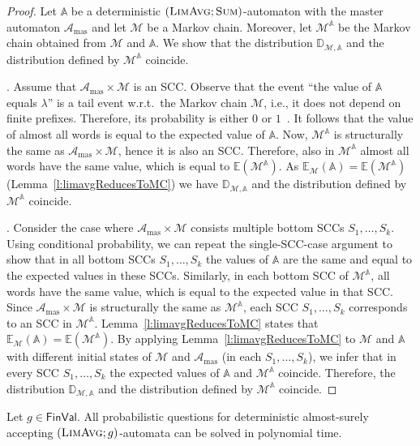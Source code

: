 \documentclass{lmcs}
\newcommand{\Paragraph}[1]{\noindent{\textbf{#1}}}
\newcommand{\masterA}{\mathcal{A}_{\textrm{mas}}}
\newcommand{\nestedA}{\mathbb{A}}
\newcommand{\MCfromNested}{\markov^{\nestedA}}
\newcommand{\fsum}{\textsc{Sum}}
\newcommand{\flimavg}{\textsc{LimAvg}}
\newcommand{\const}{\lambda}
\newcommand{\FinVal}{\mathsf{FinVal}}
\newcommand{\expected}{\mathbb{E}}
\newcommand{\distrib}{\mathbb{D}}
\newcommand{\markov}{\mathcal{M}}
\begin{document}
\begin{proof}
Let $\nestedA$ be a deterministic $(\flimavg;\fsum)$-automaton with the master automaton $\masterA$ and let $\markov$ be a Markov chain.
Moreover, let  $\MCfromNested$ be the Markov chain obtained from $\markov$ and $\nestedA$.
We show that the distribution $\distrib_{\markov,\nestedA}$ and the distribution defined by ${\MCfromNested}$ coincide.

\Paragraph{The single-SCC case}. Assume that $\masterA \times \markov$ is an SCC\@.
Observe that the event ``the value of $\nestedA$ equals  $\const$''
is a tail event w.r.t.\ the Markov chain $\markov$, i.e., it does not depend on finite prefixes.
Therefore, its probability is either $0$ or $1$~\cite{feller}. It follows that
the value of almost all words is equal to the expected value of $\nestedA$.
Now, $\MCfromNested$ is structurally the same as $\masterA \times \markov$, hence it is also an SCC\@.
Therefore, also in  $\MCfromNested$ almost all words have the same value, which is equal to $\expected(\MCfromNested)$.
As $\expected_{\markov}(\nestedA) = \expected(\MCfromNested)$ (Lemma~\ref{l:limavgReducesToMC}) we have
$\distrib_{\markov,\nestedA}$ and the distribution defined by ${\MCfromNested}$ coincide.
\smallskip

\Paragraph{The general case}. Consider the case where $\masterA \times \markov$ consists multiple bottom SCCs $S_1,  \ldots, S_k$.
Using conditional probability, we can repeat the single-SCC-case argument to show that in all bottom SCCs $S_1,  \ldots, S_k$
the values of $\nestedA$ are the same and equal to the expected values in these SCCs.
Similarly, in each bottom SCC of ${\MCfromNested}$, all words have the same value, which is equal to the expected value in that SCC\@.
Since $\masterA \times \markov$ is structurally the same as $\MCfromNested$, each SCC $S_1,  \ldots, S_k$  corresponds to an SCC in
${\MCfromNested}$. Lemma~\ref{l:limavgReducesToMC} states that $\expected_{\markov}(\nestedA) = \expected(\MCfromNested)$.
By applying Lemma~\ref{l:limavgReducesToMC}  to $\markov$ and $\nestedA$ with different initial states
of $\markov$ and $\masterA$ (in each $S_1, \ldots, S_k$), we infer that in every SCC $S_1,  \ldots, S_k$
the expected values of $\nestedA$ and $\MCfromNested$ coincide. Therefore, the distribution
 $\distrib_{\markov,\nestedA}$ and the distribution defined by ${\MCfromNested}$ coincide.
\end{proof}




\begin{thm}\label{th:compLimAvg}
Let $g \in \FinVal$.
All probabilistic questions for deterministic almost-surely accepting  $(\flimavg; g)$-automata
can be solved in polynomial time.
\end{thm}
\end{document}
